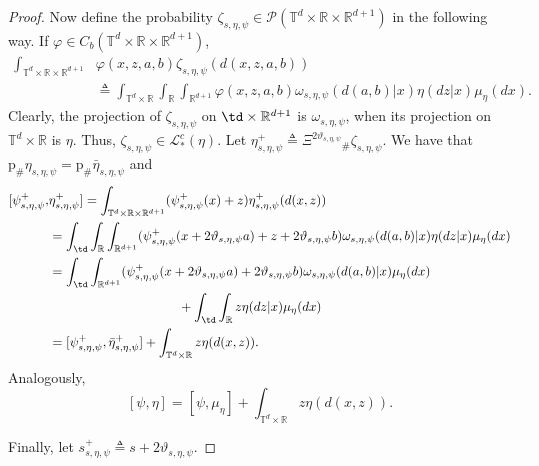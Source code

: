 \documentclass[a4paper,12pt]{article}
\newcommand{\rdp}{\mathbb{R}^{d+1}}
\newcommand{\tdr}{\mathbb{T}^{d}\times\mathbb{R}}
\begin{document}
\begin{proof}
	
	Now define the probability $\zeta_{s,\eta,\psi}\in \mathcal{P}(\tdr\times\rdp)$ in the following way.
	If $\varphi\in C_b(\tdr\times\rdp)$,
	\begin{equation*}
	\label{intro:zeta_shigt}
	\begin{split}\int_{\tdr\times\rdp}&\varphi(x,z,a,b)\zeta_{s,\eta,\psi}(d(x,z,a,b))\\&\triangleq\int_{\tdr}\int_{\mathbb{R}} \int_{\rdp}\varphi(x,z,a,b)\omega_{s,\eta,\psi}(d(a,b)|x)\eta(dz|x)\mu_\eta(dx).
	\end{split}
	\end{equation*} 
	Clearly,  the projection of $\zeta_{s,\eta,\psi}$ on $\td\times\rdp$ is $\omega_{s,\eta,\psi}$, when its projection on $\tdr$ is $\eta$. Thus,
	$\zeta_{s,\eta,\psi}\in\mathcal{L}_*^c(\eta)$.  Let $\eta^+_{s,\eta,\psi}\triangleq \Xi^{2\vartheta_{s,\eta,\psi}}{}_\#\zeta_{s,\eta,\psi}$. We have that 
	$\mathrm{p}_\#\eta_{s,\eta,\psi}=\mathrm{p}_\#\bar{\eta}_{s,\eta,\psi}$ and 
	\begin{equation*}
	\begin{split}
	[\psi^+_{s,\eta,\psi},&\eta^+_{s,\eta,\psi}]=\int_{\tdr\times\rdp}(\psi^+_{s,\eta,\psi}(x)+z) \eta^+_{s,\eta,\psi}(d(x,z))\\&=
	\int_{\td}\int_{\mathbb{R}}\int_{\rdp}(\psi^+_{s,\eta,\psi}(x+2\vartheta_{s,\eta,\psi}a)+z+2\vartheta_{s,\eta,\psi}b) \omega_{s,\eta,\psi}(d(a,b)|x)\eta(dz|x)\mu_\eta(dx)\\
	&=\int_{\td}\int_{\rdp}(\psi^+_{s,\eta,\psi}(x+2\vartheta_{s,\eta,\psi}a)+2\vartheta_{s,\eta,\psi}b) \omega_{s,\eta,\psi}(d(a,b)|x)\mu_\eta(dx)\\ &{}\hspace{100pt}+\int_{\td}\int_{\mathbb{R}}z\eta(dz|x)\mu_\eta(dx)\\&=
	[\psi^+_{s,\eta,\psi},\bar{\eta}^+_{s,\eta,\psi}]+\int_{\tdr}z\eta(d(x,z)).
	\end{split}
	\end{equation*} Analogously, 
	$$[\psi,\eta]=[\psi,\mu_\eta]+\int_{\tdr}z\eta(d(x,z)). $$
	
	Finally, let $s^+_{s,\eta,\psi}\triangleq s+2\vartheta_{s,\eta,\psi}$.
	

\end{proof}
\end{document}

